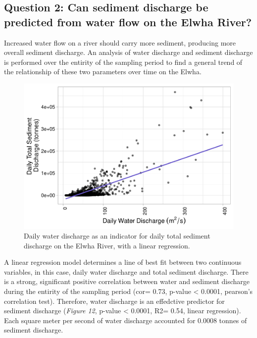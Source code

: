 \documentclass[12pt,]{article}
\begin{document}
\newpage

\hypertarget{question-2-can-sediment-discharge-be-predicted-from-water-flow-on-the-elwha-river}{%
\subsection{Question 2: Can sediment discharge be predicted from water
flow on the Elwha
River?}\label{question-2-can-sediment-discharge-be-predicted-from-water-flow-on-the-elwha-river}}

Increased water flow on a river should carry more sediment, producing
more overall sediment discharge. An analysis of water discharge and
sediment discharge is performed over the entirity of the sampling period
to find a general trend of the relationship of these two parameters over
time on the Elwha.

\begin{figure}
\centering
\includegraphics{Mason_ENV872_ProjectFinal_files/figure-latex/Linear Regression (figure 12)-1.pdf}
\caption{Daily water discharge as an indicator for daily total sediment
discharge on the Elwha River, with a linear regression.}
\end{figure}

A linear regression model determines a line of best fit between two
continuous variables, in this case, daily water discharge and total
sediment discharge. There is a strong, significant positive correlation
between water and sediment discharge during the entirity of the sampling
period (cor= 0.73, p-value \textless{} 0.0001, pearson's correlation
test). Therefore, water discharge is an effedctive predictor for
sediment discharge (\emph{Figure 12}, p-value \textless{} 0.0001, R2=
0.54, linear regression). Each square meter per second of water
discharge accounted for 0.0008 tonnes of sediment discharge.
\end{document}
